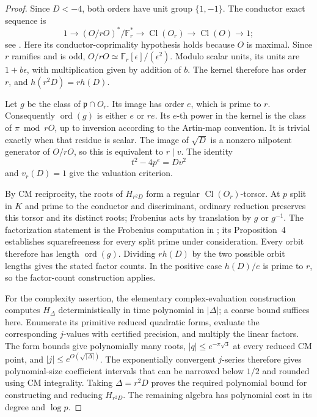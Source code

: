 \documentclass[11pt]{article}
\theoremstyle{definition}
\theoremstyle{remark}
\begin{document}
\begin{proof}
Since $D<-4$, both orders have unit group $\{1,-1\}$.
The conductor exact sequence is
\[
1\longrightarrow (O/rO)^*/\mathbb F_r^*
 \longrightarrow\operatorname{Cl}(O_r)
 \longrightarrow\operatorname{Cl}(O)\longrightarrow1;
\]
see \cite[\S3, (3)]{BrokerLauterSutherland2012}.
Here its conductor-coprimality hypothesis holds because $O$ is
maximal.  Since $r$ ramifies and is odd,
$O/rO\simeq\mathbb F_r[\epsilon]/(\epsilon^2)$.
Modulo scalar units, its units are $1+b\epsilon$, with multiplication
given by addition of $b$.  The kernel therefore has order $r$,
and $h(r^2D)=r h(D)$.

Let $g$ be the class of $\mathfrak p\cap O_r$.
Its image has order $e$, which is prime to $r$.
Consequently $\operatorname{ord}(g)$ is either $e$ or $re$.
Its $e$-th power in the kernel is the class of $\pi\bmod rO$,
up to inversion according to the Artin-map convention.
It is trivial exactly when that residue is scalar.
The image of $\sqrt D$ is a nonzero nilpotent generator of $O/rO$,
so this is equivalent to $r\mid v$.
The identity
\[
 t^2-4p^e=Dv^2
\]
and $v_r(D)=1$ give the valuation criterion.

By CM reciprocity, the roots of $H_{r^2D}$ form a regular
$\operatorname{Cl}(O_r)$-torsor.
At $p$ split in $K$ and prime to the conductor and discriminant,
ordinary reduction preserves this torsor and its distinct roots;
Frobenius acts by translation by $g$ or $g^{-1}$.
The factorization statement is the Frobenius computation in
\cite[\S2.3]{CremonaSutherland2024}; its Proposition~4 establishes
squarefreeness for every split prime under consideration.
Every orbit therefore has length $\operatorname{ord}(g)$.
Dividing $r h(D)$ by the two possible orbit lengths gives the stated
factor counts.  In the positive case $h(D)/e$ is prime to $r$, so
the factor-count construction applies.

For the complexity assertion, the elementary complex-evaluation
construction computes $H_\Delta$ deterministically in time
polynomial in $|\Delta|$; a coarse bound suffices here.
Enumerate its primitive reduced quadratic forms, evaluate the
corresponding $j$-values with certified precision, and multiply the
linear factors.  The form bounds give polynomially many roots,
$|q|\le e^{-\pi\sqrt3}$ at every reduced CM point, and
$|j|\le e^{O(\sqrt{|\Delta|})}$.
The exponentially convergent $j$-series therefore gives
polynomial-size coefficient intervals that can be narrowed below
$1/2$ and rounded using CM integrality.
Taking $\Delta=r^2D$ proves the required polynomial bound for
constructing and reducing $H_{r^2D}$.
The remaining algebra has polynomial cost in its degree and
$\log p$.
\end{proof}
\end{document}
